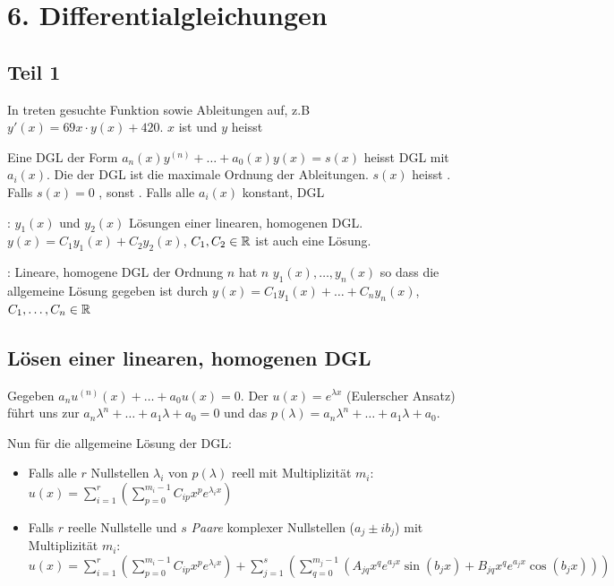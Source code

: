 \section{6. Differentialgleichungen}

\subsection{Teil 1}

\Def In  treten gesuchte Funktion sowie Ableitungen auf,
z.B $y'(x) = 69x \cdot y(x) + 420$. $x$ ist  und $y$ heisst

\Def Eine DGL der Form
$a_n(x)y^{(n)} + \ldots + a_0(x)y(x) = s(x)$
heisst  DGL mit  $a_i(x)$. Die  der DGL ist
die maximale Ordnung der Ableitungen. $s(x)$ heisst . Falls $s(x) = 0$
, sonst .
Falls alle $a_i(x)$ konstant, DGL 

\Satz {}: $y_1(x)$ und $y_2(x)$ Lösungen einer linearen, homogenen DGL.
$y(x) = C_1 y_1(x) + C_2 y_2(x)$, $C_1, C_2 \in \mathbb{R}$ ist auch eine Lösung.

\Satz {}: Lineare, homogene DGL der Ordnung $n$ hat $n$
 $y_1(x), \ldots, y_n(x)$ so dass die allgemeine Lösung gegeben ist durch
$y(x) = C_1 y_1(x) + \ldots + C_n y_n(x)$, $C_1, \ldots, C_n \in \mathbb{R}$

\subsection{Lösen einer linearen, homogenen DGL}

Gegeben $a_n u^{(n)}(x) + \ldots + a_0 u(x) = 0$. Der  $u(x) = e^{\lambda x}$
(Eulerscher Ansatz) führt uns zur 
$a_n \lambda^n + \ldots + a_1 \lambda + a_0 = 0$ und das 
$p(\lambda) = a_n \lambda^n + \ldots + a_1 \lambda + a_0$.

Nun für die allgemeine Lösung der DGL:
\vspace{-0.6em}
\begin{itemize}
    \item Falls alle $r$ Nullstellen $\lambda_i$ von $p(\lambda)$ reell mit Multiplizität $m_i$:
    $u(x) = \sum_{i=1}^{r} \left(\sum_{p=0}^{m_i-1} C_{ip}x^pe^{\lambda_i x}\right)$
    \item Falls $r$ reelle Nullstelle und $s$ \textit{Paare} komplexer Nullstellen ($a_j \pm ib_j$)
    mit Multiplizität $m_i$:
    $u(x) = \sum_{i=1}^{r}\left(\sum_{p=0}^{m_i - 1}C_{ip} x^p e^{\lambda_i x}\right) + \sum_{j=1}^{s} \left(\sum_{q=0}^{m_j-1}(A_{jq} x^q e^{a_j x} \sin(b_j x) + B_{jq} x^q e^{a_j x} \cos(b_j x))\right)$
\end{itemize}


